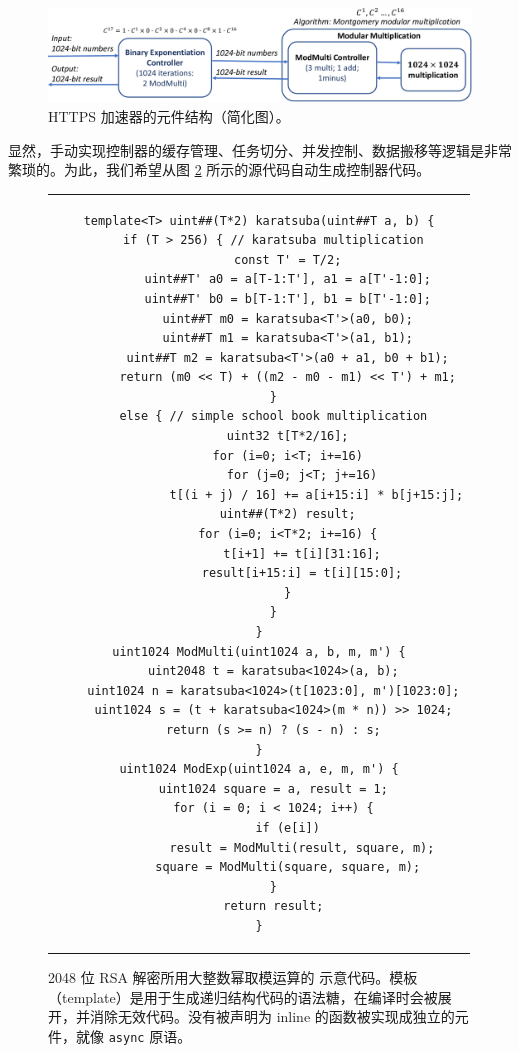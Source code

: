 \begin{figure}[htbp]
	\centering
	\includegraphics[width=1.0\textwidth]{image/https_accelerator}
	\caption{HTTPS 加速器的元件结构（简化图）。}
	\label{clicknp:fig:https-accelerator}
\end{figure}

显然，手动实现控制器的缓存管理、任务切分、并发控制、数据搬移等逻辑是非常繁琐的。为此，我们希望从图 \ref{clicknp:fig:rsa-code} 所示的源代码自动生成控制器代码。


\begin{figure}[t!]
	\renewcommand{\baselinestretch}{0.75}
	\small
	\centering
	\begin{tabular}{c}
\begin{lstlisting}
template<T> uint##(T*2) karatsuba(uint##T a, b) {
    if (T > 256) { // karatsuba multiplication
        const T' = T/2;
        uint##T' a0 = a[T-1:T'], a1 = a[T'-1:0];
        uint##T' b0 = b[T-1:T'], b1 = b[T'-1:0];
        uint##T m0 = karatsuba<T'>(a0, b0);
        uint##T m1 = karatsuba<T'>(a1, b1);
        uint##T m2 = karatsuba<T'>(a0 + a1, b0 + b1);
        return (m0 << T) + ((m2 - m0 - m1) << T') + m1;
    }
    else { // simple school book multiplication
        uint32 t[T*2/16];
        for (i=0; i<T; i+=16)
            for (j=0; j<T; j+=16)
                t[(i + j) / 16] += a[i+15:i] * b[j+15:j];
        uint##(T*2) result;
        for (i=0; i<T*2; i+=16) {
            t[i+1] += t[i][31:16];
            result[i+15:i] = t[i][15:0];
        }
    }
}
uint1024 ModMulti(uint1024 a, b, m, m') {
    uint2048 t = karatsuba<1024>(a, b);
    uint1024 n = karatsuba<1024>(t[1023:0], m')[1023:0];
    uint1024 s = (t + karatsuba<1024>(m * n)) >> 1024;
    return (s >= n) ? (s - n) : s;
}
uint1024 ModExp(uint1024 a, e, m, m') {
    uint1024 square = a, result = 1;
    for (i = 0; i < 1024; i++) {
        if (e[i])
            result = ModMulti(result, square, m);
        square = ModMulti(square, square, m);
    }
    return result;
}
\end{lstlisting}
	\end{tabular}
	\caption{2048 位 RSA 解密所用大整数幂取模运算的 \name 示意代码。\name 模板（template）是用于生成递归结构代码的语法糖，在编译时会被展开，并消除无效代码。没有被声明为 inline 的函数被实现成独立的元件，就像 \texttt{async} 原语。}
	\label{clicknp:fig:rsa-code}
\end{figure}



